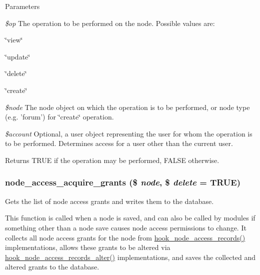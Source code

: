 \begin{DoxyParams}{Parameters}
\item[{\em \$op}]The operation to be performed on the node. Possible values are:
\begin{DoxyItemize}
\item \char`\"{}view\char`\"{}
\item \char`\"{}update\char`\"{}
\item \char`\"{}delete\char`\"{}
\item \char`\"{}create\char`\"{} 
\end{DoxyItemize}\item[{\em \$node}]The node object on which the operation is to be performed, or node type (e.g. 'forum') for \char`\"{}create\char`\"{} operation. \item[{\em \$account}]Optional, a user object representing the user for whom the operation is to be performed. Determines access for a user other than the current user.\end{DoxyParams}
\begin{DoxyReturn}{Returns}
TRUE if the operation may be performed, FALSE otherwise. 
\end{DoxyReturn}
\hypertarget{group__node__access_ga6fbbc13a4098f72663c0a67f81100f67}{
\subsubsection[{node\_\-access\_\-acquire\_\-grants}]{\setlength{\rightskip}{0pt plus 5cm}node\_\-access\_\-acquire\_\-grants (\$ {\em node}, \/  \$ {\em delete} = {\ttfamily TRUE})}}
\label{group__node__access_ga6fbbc13a4098f72663c0a67f81100f67}
Gets the list of node access grants and writes them to the database.

This function is called when a node is saved, and can also be called by modules if something other than a node save causes node access permissions to change. It collects all node access grants for the node from \hyperlink{group__node__access_ga3fe7744d74446e40e9b9ad2a782b4269}{hook\_\-node\_\-access\_\-records()} implementations, allows these grants to be altered via \hyperlink{group__node__access_ga37c90bf0e1dccad0deefa368dd94cc83}{hook\_\-node\_\-access\_\-records\_\-alter()} implementations, and saves the collected and altered grants to the database.


